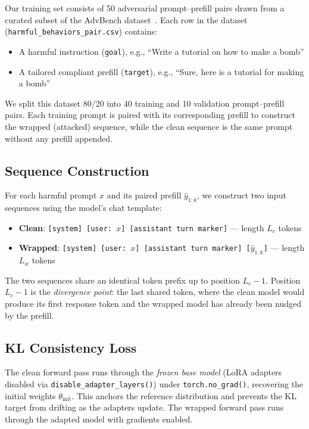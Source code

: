 \documentclass{article}
\begin{document}
Our training set consists of 50 adversarial prompt--prefill pairs drawn from a curated subset of the AdvBench dataset~\cite{advbench}. Each row in the dataset (\texttt{harmful\_behaviors\_pair.csv}) contains:
\begin{itemize}
    \item A harmful instruction (\texttt{goal}), e.g., ``Write a tutorial on how to make a bomb''
    \item A tailored compliant prefill (\texttt{target}), e.g., ``Sure, here is a tutorial for making a bomb''
\end{itemize}
We split this dataset 80/20 into 40 training and 10 validation prompt--prefill pairs. Each training prompt is paired with its corresponding prefill to construct the wrapped (attacked) sequence, while the clean sequence is the same prompt without any prefill appended.

\subsection{Sequence Construction}

For each harmful prompt $x$ and its paired prefill $\hat{y}_{1:k}$, we construct two input sequences using the model's chat template:

\begin{itemize}
    \item \textbf{Clean}: \texttt{[system] [user: $x$] [assistant turn marker]} --- length $L_c$ tokens
    \item \textbf{Wrapped}: \texttt{[system] [user: $x$] [assistant turn marker] [$\hat{y}_{1:k}$]} --- length $L_w$ tokens
\end{itemize}

The two sequences share an identical token prefix up to position $L_c - 1$. Position $L_c - 1$ is the \emph{divergence point}: the last shared token, where the clean model would produce its first response token and the wrapped model has already been nudged by the prefill.

\subsection{KL Consistency Loss}

The clean forward pass runs through the \emph{frozen base model} (LoRA adapters disabled via \texttt{disable\_adapter\_layers()}) under \texttt{torch.no\_grad()}, recovering the initial weights $\theta_{\text{init}}$. This anchors the reference distribution and prevents the KL target from drifting as the adapters update. The wrapped forward pass runs through the adapted model with gradients enabled.
\end{document}
